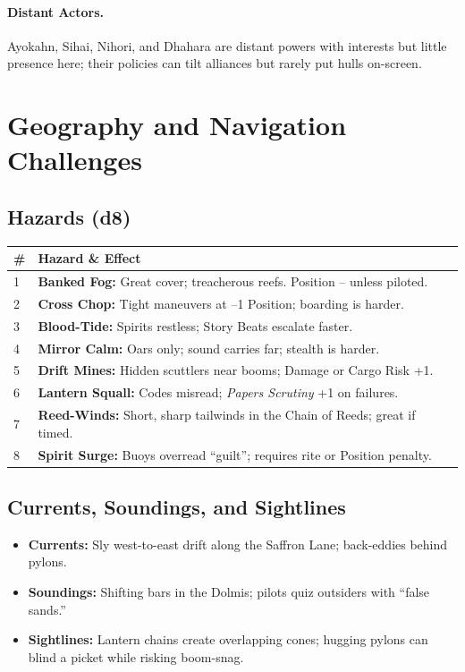 \documentclass[11pt,oneside]{book}
\begin{document}
\paragraph{Distant Actors.} Ayokahn, Sihai, Nihori, and Dhahara are distant powers with interests but little presence here; their policies can tilt alliances but rarely put hulls on-screen.

\section{Geography and Navigation Challenges}
\subsection*{Hazards (d8)}
\begin{tabularx}{\linewidth}{@{}p{0.7cm} X@{}}
\toprule
\# & \textbf{Hazard \& Effect}\\
\midrule
1 & \textbf{Banked Fog:} Great cover; treacherous reefs. Position -- unless piloted.\\
2 & \textbf{Cross Chop:} Tight maneuvers at --1 Position; boarding is harder.\\
3 & \textbf{Blood-Tide:} Spirits restless; Story Beats escalate faster.\\
4 & \textbf{Mirror Calm:} Oars only; sound carries far; stealth is harder.\\
5 & \textbf{Drift Mines:} Hidden scuttlers near booms; Damage or Cargo Risk +1.\\
6 & \textbf{Lantern Squall:} Codes misread; \textit{Papers Scrutiny} +1 on failures.\\
7 & \textbf{Reed-Winds:} Short, sharp tailwinds in the Chain of Reeds; great if timed.\\
8 & \textbf{Spirit Surge:} Buoys overread ``guilt''; requires rite or Position penalty.\\
\bottomrule
\end{tabularx}

\subsection*{Currents, Soundings, and Sightlines}
\begin{itemize}
  \item \textbf{Currents:} Sly west-to-east drift along the Saffron Lane; back-eddies behind pylons.
  \item \textbf{Soundings:} Shifting bars in the Dolmis; pilots quiz outsiders with ``false sands.''
  \item \textbf{Sightlines:} Lantern chains create overlapping cones; hugging pylons can blind a picket while risking boom-snag.
\end{itemize}
\end{document}
